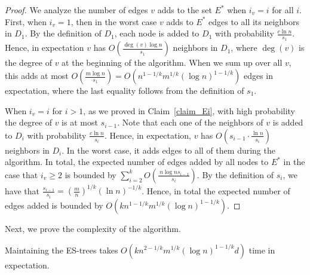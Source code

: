 \begin{proof}
We analyze the number of edges $v$ adds to the set $E^*$ when $i_v=i$ for all $i$. First, when $i_v=1$, then in the worst case $v$ adds to $E^*$ edges to all its neighbors in $D_1$. By the definition of $D_1$, each node is added to $D_1$ with probability $\frac{c\ln{n}}{s_1}$. Hence, in expectation $v$ has $O(\frac{\deg(v) \log{n}}{s_1})$ neighbors in $D_1$, where $\deg(v)$ is the degree of $v$ at the beginning of the algorithm. When we sum up over all $v$, this adds at most $O(\frac{m \log{n}}{s_1})=O(n^{1-1/k}m^{1/k}(\log{n})^{1-1/k})$ edges in expectation, where the last equality follows from the definition of $s_1$.

When $i_v=i$ for $i > 1$, as we proved in Claim~\ref{claim_Ei}, with high probability the degree of $v$ is at most $s_{i-1}$. Note that each one of the neighbors of $v$ is added to $D_i$ with probability $\frac{c\ln{n}}{s_i}$. Hence, in expectation, $v$ has $O(s_{i-1} \cdot \frac{\ln{n}}{s_i})$ neighbors in $D_i$. In the worst case, it adds edges to all of them during the algorithm. In total, the expected number of edges added by all nodes to $E^*$ in the case that $i_v \geq 2$ is bounded by $\sum_{i=2}^{k} O(\frac{\ n \log{n} s_{i-1}}{s_i})$.
By the definition of $s_i$, we have that $\frac{s_{i-1}}{s_i}=(\frac{m}{n})^{1/k}(\ln{n})^{-1/k}$. Hence, in total the expected number of edges added is bounded by $O(k n^{1-1/k}m^{1/k}(\log{n})^{1-1/k}).$
\end{proof}

Next, we prove the complexity of the algorithm. 

\begin{lemma}\label{lemma_time_additive}
Maintaining the ES-trees takes $O(kn^{2-1/k}m^{1/k}(\log{n})^{1-1/k} d)$ time in expectation.
\end{lemma}

